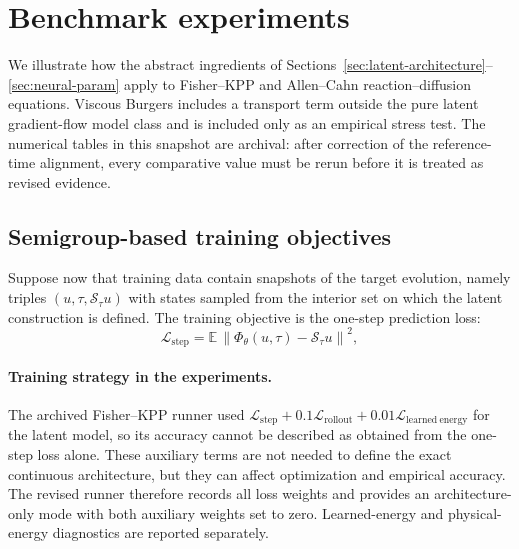 \documentclass[hidelinks,review,nohypdvips,onefignum,onetabnum]{siamart220329}
\newcommand{\cS}{\mathcal{S}}
\newcommand{\E}{\mathbb{E}}
\newcommand{\PhiT}{\Phi_{\theta}}
\newcommand{\norm}[1]{\left\lVert #1 \right\rVert}
\begin{document}
\section{Benchmark experiments}\label{sec:benchmark}

We illustrate how the abstract ingredients of Sections~\ref{sec:latent-architecture}--\ref{sec:neural-param} apply to Fisher--KPP and Allen--Cahn reaction--diffusion equations. Viscous Burgers includes a transport term outside the pure latent gradient-flow model class and is included only as an empirical stress test. The numerical tables in this snapshot are archival: after correction of the reference-time alignment, every comparative value must be rerun before it is treated as revised evidence.

\subsection{Semigroup-based training objectives}\label{subsec:training}
Suppose now that training data contain snapshots of the target evolution, namely triples $(u,\tau,\cS_{\tau}u)$ with states sampled from the interior set on which the latent construction is defined. The training objective is the one-step prediction loss:
\begin{equation}\label{eq:loss-step}
\mathcal L_{\mathrm{step}}=\E\,\norm{\PhiT(u,\tau)-\cS_{\tau}u}^2,
\end{equation}

\paragraph{Training strategy in the experiments.}
The archived Fisher--KPP runner used $\mathcal L_{\mathrm{step}}+0.1\mathcal L_{\mathrm{rollout}}+0.01\mathcal L_{\mathrm{learned\ energy}}$ for the latent model, so its accuracy cannot be described as obtained from the one-step loss alone. These auxiliary terms are not needed to define the exact continuous architecture, but they can affect optimization and empirical accuracy. The revised runner therefore records all loss weights and provides an architecture-only mode with both auxiliary weights set to zero. Learned-energy and physical-energy diagnostics are reported separately.
\end{document}
